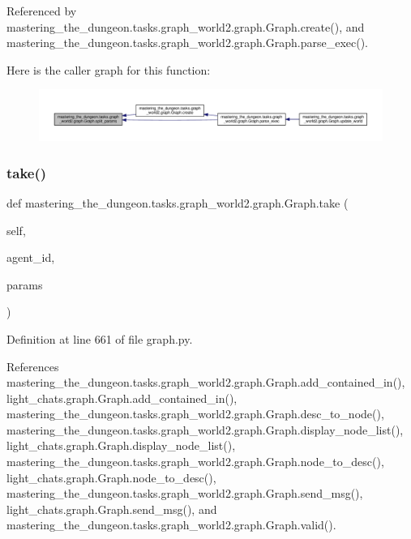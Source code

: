Referenced by mastering\+\_\+the\+\_\+dungeon.\+tasks.\+graph\+\_\+world2.\+graph.\+Graph.\+create(), and mastering\+\_\+the\+\_\+dungeon.\+tasks.\+graph\+\_\+world2.\+graph.\+Graph.\+parse\+\_\+exec().

Here is the caller graph for this function\+:
\nopagebreak
\begin{figure}[H]
\begin{center}
\leavevmode
\includegraphics[width=350pt]{classmastering__the__dungeon_1_1tasks_1_1graph__world2_1_1graph_1_1Graph_ad6154c88ce3c912fbe9dce0cd8e96d13_icgraph}
\end{center}
\end{figure}
\mbox{\label{classmastering__the__dungeon_1_1tasks_1_1graph__world2_1_1graph_1_1Graph_af0e00cef49829df438b8687ff03afc94}} 
\subsubsection{\texorpdfstring{take()}{take()}}
{\footnotesize\ttfamily def mastering\+\_\+the\+\_\+dungeon.\+tasks.\+graph\+\_\+world2.\+graph.\+Graph.\+take (\begin{DoxyParamCaption}\item[{}]{self,  }\item[{}]{agent\+\_\+id,  }\item[{}]{params }\end{DoxyParamCaption})}



Definition at line 661 of file graph.\+py.



References mastering\+\_\+the\+\_\+dungeon.\+tasks.\+graph\+\_\+world2.\+graph.\+Graph.\+add\+\_\+contained\+\_\+in(), light\+\_\+chats.\+graph.\+Graph.\+add\+\_\+contained\+\_\+in(), mastering\+\_\+the\+\_\+dungeon.\+tasks.\+graph\+\_\+world2.\+graph.\+Graph.\+desc\+\_\+to\+\_\+node(), mastering\+\_\+the\+\_\+dungeon.\+tasks.\+graph\+\_\+world2.\+graph.\+Graph.\+display\+\_\+node\+\_\+list(), light\+\_\+chats.\+graph.\+Graph.\+display\+\_\+node\+\_\+list(), mastering\+\_\+the\+\_\+dungeon.\+tasks.\+graph\+\_\+world2.\+graph.\+Graph.\+node\+\_\+to\+\_\+desc(), light\+\_\+chats.\+graph.\+Graph.\+node\+\_\+to\+\_\+desc(), mastering\+\_\+the\+\_\+dungeon.\+tasks.\+graph\+\_\+world2.\+graph.\+Graph.\+send\+\_\+msg(), light\+\_\+chats.\+graph.\+Graph.\+send\+\_\+msg(), and mastering\+\_\+the\+\_\+dungeon.\+tasks.\+graph\+\_\+world2.\+graph.\+Graph.\+valid().



